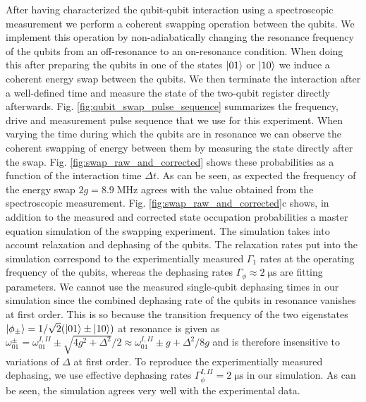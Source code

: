 After having characterized the qubit-qubit interaction using a spectroscopic measurement we perform a coherent swapping operation between the qubits. We implement this operation by non-adiabatically changing the resonance frequency of the qubits from an off-resonance to an on-resonance condition. When doing this after preparing the qubits in one of the states $\left| 01 \right>$ or $\left| 10 \right>$ we induce a coherent energy swap between the qubits. We then terminate the interaction after a well-defined time and measure the state of the two-qubit register directly afterwards. Fig. \ref{fig:qubit_swap_pulse_sequence} summarizes the frequency, drive and measurement pulse sequence that we use for this experiment. When varying the time during which the qubits are in resonance we can observe the coherent swapping of energy between them by measuring the state directly after the swap. Fig. \ref{fig:swap_raw_and_corrected} shows these probabilities as a function of the interaction time $\Delta t$. As can be seen, as expected the frequency of the energy swap $2g=8.9\;\mathrm{MHz}$ agrees with the value obtained from the spectroscopic measurement. Fig. \ref{fig:swap_raw_and_corrected}c shows, in addition to the measured and corrected state occupation probabilities a master equation simulation of the swapping experiment. The simulation takes into account relaxation and dephasing of the qubits. The relaxation rates put into the simulation correspond to the experimentially measured $\Gamma_1$ rates at the operating frequency of the qubits, whereas the dephasing rates $\Gamma_\phi\approx 2\;\mathrm{\mu s}$ are fitting parameters. We cannot use the measured single-qubit dephasing times in our simulation since the combined dephasing rate of the qubits in resonance vanishes at first order. This is so because the transition frequency of the two eigenstates $\left| \phi_\pm \right>=1/\sqrt{2}(\left| 01 \right>\pm\left| 10 \right>)$ at resonance is given as $\omega_{01}^{\pm}=\omega_{01}^{I,II}\pm\sqrt{4g^2+\Delta^2}/2\approx \omega_{01}^{I,II}\pm g +\Delta^2/8g$ and is therefore insensitive to variations of $\Delta$ at first order. To reproduce the experimentially measured dephasing, we use effective dephasing rates $\Gamma_\phi^{I,II}=2\;\mathrm{\mu s}$ in our simulation. As can be seen, the simulation agrees very well with the experimental data.

